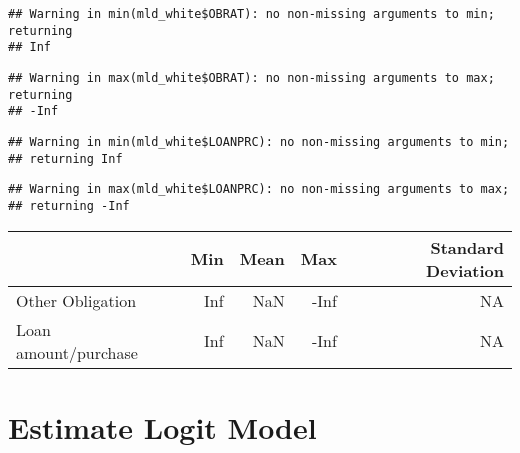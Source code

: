 \documentclass[]{article}
\newenvironment{Shaded}{\begin{snugshade}}{\end{snugshade}}
\newcommand{\DataTypeTok}[1]{\textcolor[rgb]{0.13,0.29,0.53}{#1}}
\newcommand{\DecValTok}[1]{\textcolor[rgb]{0.00,0.00,0.81}{#1}}
\newcommand{\KeywordTok}[1]{\textcolor[rgb]{0.13,0.29,0.53}{\textbf{#1}}}
\newcommand{\NormalTok}[1]{#1}
\newcommand{\OperatorTok}[1]{\textcolor[rgb]{0.81,0.36,0.00}{\textbf{#1}}}
\newcommand{\OtherTok}[1]{\textcolor[rgb]{0.56,0.35,0.01}{#1}}
\newcommand{\StringTok}[1]{\textcolor[rgb]{0.31,0.60,0.02}{#1}}
\begin{document}
\begin{verbatim}
## Warning in min(mld_white$OBRAT): no non-missing arguments to min; returning
## Inf
\end{verbatim}

\begin{verbatim}
## Warning in max(mld_white$OBRAT): no non-missing arguments to max; returning
## -Inf
\end{verbatim}

\begin{verbatim}
## Warning in min(mld_white$LOANPRC): no non-missing arguments to min;
## returning Inf
\end{verbatim}

\begin{verbatim}
## Warning in max(mld_white$LOANPRC): no non-missing arguments to max;
## returning -Inf
\end{verbatim}

\begin{Shaded}
\end{Shaded}

\begin{table}[H]
\centering
\begin{tabular}{l|r|r|r|r}
\hline
  & Min & Mean & Max & Standard Deviation\\
\hline
Other Obligation & Inf & NaN & -Inf & NA\\
\hline
Loan amount/purchase & Inf & NaN & -Inf & NA\\
\hline
\end{tabular}
\end{table}

\hypertarget{estimate-logit-model}{%
\section{Estimate Logit Model}\label{estimate-logit-model}}
\end{document}
